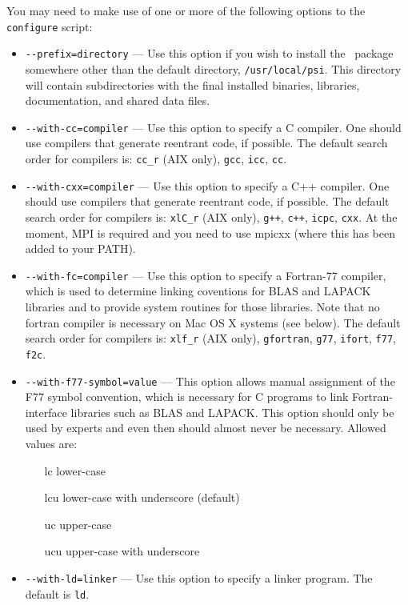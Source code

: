 \documentclass[12pt]{article}
\begin{document}
\noindent
You may need to make use of one or more of the following options to
the {\tt configure} script:
\begin{itemize}
\item {\tt -}{\tt -prefix=directory} --- Use this option if you wish to
  install the \PSIfour\ package somewhere other than the default
  directory, {\tt /usr/local/psi}.  This directory will contain
  subdirectories with the final installed binaries, libraries, 
  documentation, and shared data files.
\item {\tt -}{\tt -with-cc=compiler} --- Use this option to specify a
  C compiler.  One should use compilers that generate reentrant code,
  if possible.  The default search order for compilers is: {\tt cc\_r} (AIX
  only), {\tt gcc}, {\tt icc}, {\tt cc}.
\item {\tt -}{\tt -with-cxx=compiler} --- Use this option to specify a
  C++ compiler.  One should use compilers that generate reentrant
  code, if possible. The default search order for compilers is: {\tt xlC\_r}
  (AIX only), {\tt g++}, {\tt c++}, {\tt icpc}, {\tt cxx}.
  At the moment, MPI is required and you need to use
  mpicxx (where this has been added to your PATH).
\item {\tt -}{\tt -with-fc=compiler} --- Use this option to specify a
  Fortran-77 compiler, which is used to determine linking coventions
  for BLAS and LAPACK libraries and to provide system routines for
  those libraries.  Note that no fortran compiler is necessary on Mac
  OS X systems (see below).  The default search order for compilers
  is: {\tt xlf\_r} (AIX only), {\tt gfortran}, {\tt g77}, {\tt ifort},
  {\tt f77}, {\tt f2c}.
\item {\tt -}{\tt -with-f77-symbol=value} --- This option allows manual
  assignment of the F77 symbol convention, which is necessary for C
  programs to link Fortran-interface libraries such as BLAS and
  LAPACK. This option should only be used by experts and even then
  should almost never be necessary.  Allowed values are:
\begin{itemize}                            
\item[lc] lower-case
\item[lcu]lower-case with underscore (default)
\item[uc] upper-case
\item[ucu] upper-case with underscore
\end{itemize}
\item {\tt -}{\tt -with-ld=linker} --- Use this option to specify
  a linker program. The default is {\tt ld}.

\end{itemize}
\end{document}
